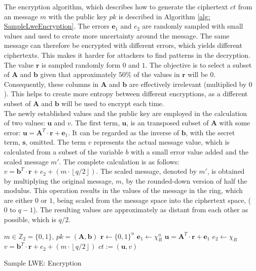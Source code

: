 The encryption algorithm, which describes how to generate the ciphertext $ct$ from an message $m$ with the public key $pk$ is described in Algorithm \ref{alg: SampleLweEncryption}. The errors $\textbf{e}_1$ and $e_2$ are randomly sampled with small values and used to create more uncertainty around the message. The same message can therefore be encrypted with different errors, which yields different ciphertexts. This makes it harder for attackers to find patterns in the decryption. The value $\textbf{r}$ is sampled randomly form $0$ and $1$. The objective is to select a subset of $\textbf{A}$ and $\textbf{b}$ given that approximately $50\%$ of the values in $\textbf{r}$ will be $0$. Consequently, these columns in $\textbf{A}$ and $\textbf{b}$ are effectively irrelevant (multiplied by $0$). This helps to create more entropy between different encryptions, as a different subset of $\textbf{A}$ and $\textbf{b}$ will be used to encrypt each time.\\
The newly established values and the public key are employed in the calculation of two values: $\textbf{u}$ and $v$. The first term, $\textbf{u}$, is an transposed subset of $\textbf{A}$ with some error: $\textbf{u} = \textbf{A}^T \cdot \textbf{r} + \textbf{e}_1$. It can be regarded as the inverse of $\textbf{b}$, with the secret term, $\textbf{s}$, omitted. The term $v$ represents the actual message value, which is calculated from a subset of the variable $b$ with a small error value added and the scaled message $m'$. The complete calculation is as follows: $v = \textbf{b}^T \cdot \textbf{r} + e_2 + (m\cdot \left\lfloor q/2\right\rfloor)$. 
The scaled message, denoted by $m'$, is obtained by multiplying the original message, $m$, by the rounded-down version of half the modulus. This operation results in the values of the message in the ring, which are either $0$ or $1$, being scaled from the message space into the ciphertext space, ($0$ to $q-1$). The resulting values are approximately as distant from each other as possible, which is $q/2$.

\begin{algorithm}[htb]
  \begin{algorithmic}[1]
    \REQUIRE $m \in \mathbb{Z}_2 = \{0, 1\}$, $pk = (\textbf{A}, \textbf{b})$
    \STATE $\textbf{r} \leftarrow \{0, 1\}^n$
    \STATE $\textbf{e}_1 \leftarrow \chi_R^n$
    \STATE $\textbf{u} = \textbf{A}^T \cdot \textbf{r} + \textbf{e}_1$
    \STATE $e_2 \leftarrow \chi_R$
    \STATE $v = \textbf{b}^T \cdot \textbf{r} + e_2 + (m\cdot \left\lfloor q/2\right\rfloor)$
    \RETURN $ct := (\textbf{u}, v)$
  \end{algorithmic}
  \caption{Sample LWE: Encryption}
  \label{alg: SampleLweEncryption}
\end{algorithm}

